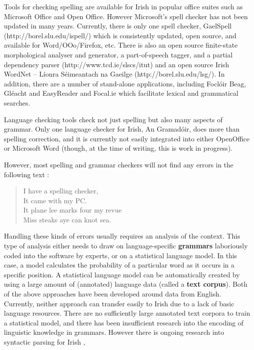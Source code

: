 \begin{multicols}{2}
Tools for checking spelling are available for Irish in popular office suites such as Microsoft Office and Open Office. However Microsoft's spell checker has not been updated in many years. Currently, there is only one spell checker, GaelSpell (http://borel.slu.edu/ispell/) which is consistently updated, open source, and available for Word/OOo/Firefox, etc. There is also an open source finite-state morphological analyser and generator, a part-of-speech tagger, and a partial dependency parser (http://www.tcd.ie/slscs/itut) and an open source Irish WordNet -- Líonra Séimeantach na Gaeilge  (http://borel.slu.edu/lsg/). In addition, there are a number of stand-alone applications, including Foclóir Beag, Gléacht and EasyReader and Focal.ie which facilitate lexical and grammatical searches. 


Language checking tools check not just spelling but also many aspects of grammar. Only one language checker for Irish, An Gramadóir,  \cite{gramadoir} does more than spelling correction, and it is currently not easily integrated into either OpenOffice or Microsoft Word (though, at the time of writing, this is work in progress).


However, most spelling and grammar checkers will not find any errors in the following text \cite{zar1}:

\begin{quote}
  I have a spelling checker,\\
  It came with my PC.\\
  It plane lee marks four my revue\\
  Miss steaks aye can knot sea.
\end{quote}

Handling these kinds of errors usually requires an analysis of the context. This type of analysis either needs to draw on language-specific \textbf{grammars} laboriously coded into the software by experts, or on a statistical language model. In this case, a model calculates the probability of a particular word as it occurs in a specific position. A statistical language model can be automatically created by using a large amount of (annotated) language data (called a \textbf{text corpus}). Both of the above approaches have been developed around data from English. Currently, neither approach can transfer easily to Irish due to a lack of basic language resources. There are no sufficiently large annotated text corpora to train a statistical model, and there has been insufficient research into the encoding of linguistic knowledge in grammars. However there is ongoing research into syntactic parsing for Irish \cite{lynn2012}, \cite{elaine2010}


\end{multicols}
